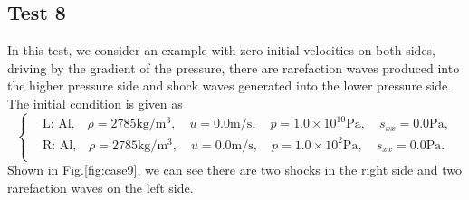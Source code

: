 \documentclass[review]{elsarticle}
\numberwithin{equation}{section}
\numberwithin{table}{section}
\begin{document}
\subsection{Test 8}
In this test, we consider an example with zero initial velocities on both sides, driving by the gradient of the pressure, there are rarefaction waves produced into the higher pressure side and shock waves generated into the lower pressure side. The initial condition is given as
\begin{equation}
 \left\{ \begin{aligned}
	 &	 \text{L: Al,}\quad  \rho = 2785 \text{kg}/\text{m}^3, \quad  u = 0.0\text{m}/\text{s}, \quad  p = 1.0\times 10^{10} \text{Pa}, \quad s_{xx}= 0.0 \text{Pa},\\
	 &	 \text{R: Al,}\quad  \rho = 2785 \text{kg}/\text{m}^3, \quad  u = 0.0\text{m}/\text{s}, \quad  p = 1.0 \times 10^2 \text{Pa}, \quad  s_{xx}=0.0\text{Pa}.\\
   \end{aligned}
 \right.
\end{equation}
Shown in Fig.\ref{fig:case9}, we can see there are two shocks in the right side and two rarefaction waves on the left side.
\end{document}
